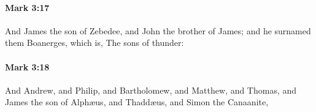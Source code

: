 		\paragraph{Mark 3:17} %
			\label{MARK-3-17}

			And James the son of Zebedee, and John the brother of James; and he surnamed them Boanerges, which is, The sons of thunder:

			\begin{framed}
			\scriptsize
				\begin{compactdesc}
					\item[SBLG] 
				\end{compactdesc}
			\end{framed}

		\paragraph{Mark 3:18} %
			\label{MARK-3-18}

			And Andrew, and Philip, and Bartholomew, and Matthew, and Thomas, and James the son of Alphæus, and Thaddæus, and Simon the Canaanite,

